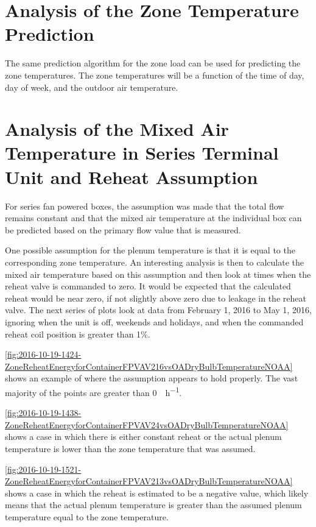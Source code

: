 \section{Analysis of the Zone Temperature Prediction} 

The same prediction algorithm for the zone load can be used for predicting the zone temperatures. The zone temperatures will be a function of the time of day, day of week, and the outdoor air temperature. 


\section{Analysis of the Mixed Air Temperature in Series Terminal Unit and Reheat Assumption}

For series fan powered boxes, the assumption was made that the total flow remains constant and that the mixed air temperature at the individual box can be predicted based on the primary flow value that is measured. 

One possible assumption for the plenum temperature is that it is equal to the corresponding zone temperature. An interesting analysis is then to calculate the mixed air temperature based on this assumption and then look at times when the reheat valve is commanded to zero. It would be expected that the calculated reheat would be near zero, if not slightly above zero due to leakage in the reheat valve.
The next series of plots look at data from February 1, 2016 to May 1, 2016, ignoring when the unit is off, weekends and holidays, and when the commanded reheat coil position is greater than 1\%. 

\figref{} \ref{fig:2016-10-19-1424-ZoneReheatEnergyforContainerFPVAV216vsOADryBulbTemperatureNOAA} shows an example of where the assumption appears to hold properly.
The vast majority of the points are greater than \SI{0}{\BTU\per\hour}.

\figref{}  \ref{fig:2016-10-19-1438-ZoneReheatEnergyforContainerFPVAV24vsOADryBulbTemperatureNOAA} shows a case in which there is either constant reheat or the actual plenum temperature is lower than the zone temperature that was assumed.

\figref{} \ref{fig:2016-10-19-1521-ZoneReheatEnergyforContainerFPVAV213vsOADryBulbTemperatureNOAA} shows a case in which the reheat is estimated to be a negative value, which likely means that the actual plenum temperature is greater than the assumed plenum temperature equal to the zone temperature. 

